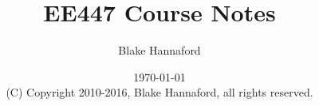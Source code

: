 \documentclass[letterpaper]{book}
\begin{document}
\setpagewiselinenumbers        %
\modulolinenumbers[5]


\frontmatter

\title{EE447 Course Notes}

\author{Blake Hannaford}

\date{\today\\(C) Copyright 2010-2016, Blake Hannaford, all rights reserved. }

\maketitle


\mainmatter

\linenumbers


\setcounter{chapter}{0}


%
% 

%
\label{LastPage}
\end{document}
